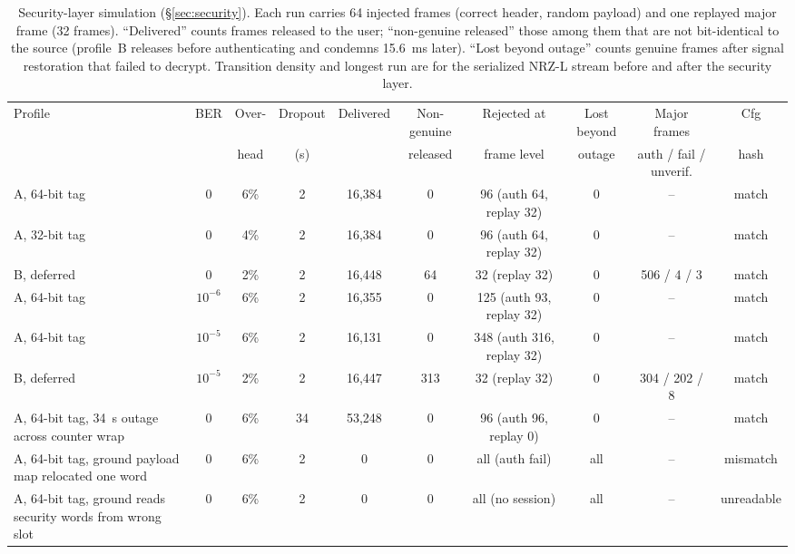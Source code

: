 \begin{table}[htbp]
  \centering
  \caption{Security-layer simulation (\S\ref{sec:security}). Each run carries 64 injected frames (correct header, random payload) and one replayed major frame (32 frames). ``Delivered'' counts frames released to the user; ``non-genuine released'' those among them that are not bit-identical to the source (profile~B releases before authenticating and condemns 15.6~ms later). ``Lost beyond outage'' counts genuine frames after signal restoration that failed to decrypt. Transition density and longest run are for the serialized NRZ-L stream before and after the security layer.}
  \label{tab:sec}
  \scriptsize
  \begin{tabular}{@{}p{3.3cm}ccccccccc@{}}
    \toprule
    Profile & BER & Over- & Dropout & Delivered & Non-genuine & Rejected at & Lost beyond & Major frames & Cfg \\
            &     & head  & (s)     &           & released    & frame level & outage      & auth / fail / unverif. & hash \\
    \midrule
    A, 64-bit tag & 0 & 6\% & 2 & 16{,}384 & 0 & 96 (auth 64, replay 32) & 0 & -- & match \\
    A, 32-bit tag & 0 & 4\% & 2 & 16{,}384 & 0 & 96 (auth 64, replay 32) & 0 & -- & match \\
    B, deferred & 0 & 2\% & 2 & 16{,}448 & 64 & 32 (replay 32) & 0 & 506 / 4 / 3 & match \\
    A, 64-bit tag & $10^{-6}$ & 6\% & 2 & 16{,}355 & 0 & 125 (auth 93, replay 32) & 0 & -- & match \\
    A, 64-bit tag & $10^{-5}$ & 6\% & 2 & 16{,}131 & 0 & 348 (auth 316, replay 32) & 0 & -- & match \\
    B, deferred & $10^{-5}$ & 2\% & 2 & 16{,}447 & 313 & 32 (replay 32) & 0 & 304 / 202 / 8 & match \\
    A, 64-bit tag, 34~s outage across counter wrap & 0 & 6\% & 34 & 53{,}248 & 0 & 96 (auth 96, replay 0) & 0 & -- & match \\
    A, 64-bit tag, ground payload map relocated one word & 0 & 6\% & 2 & 0 & 0 & all (auth fail) & all & -- & mismatch \\
    A, 64-bit tag, ground reads security words from wrong slot & 0 & 6\% & 2 & 0 & 0 & all (no session) & all & -- & unreadable \\
    \bottomrule
  \end{tabular}


\end{table}
